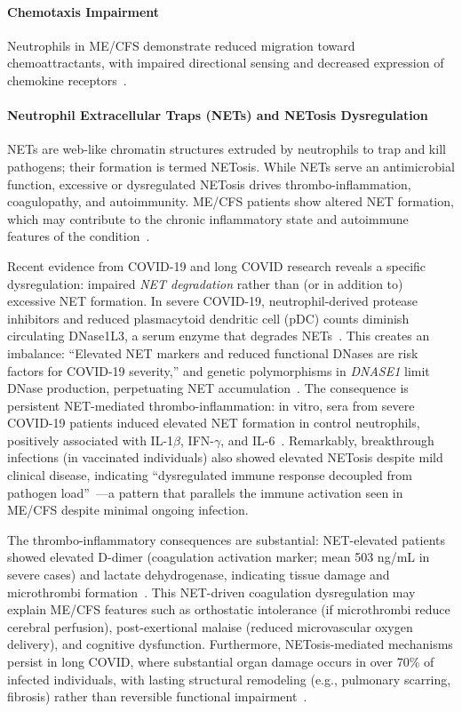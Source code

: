 \paragraph{Chemotaxis Impairment}
Neutrophils in ME/CFS demonstrate reduced migration toward chemoattractants, with impaired directional sensing and decreased expression of chemokine receptors~\cite{EatonFitch2019}.

\paragraph{Neutrophil Extracellular Traps (NETs) and NETosis Dysregulation}

NETs are web-like chromatin structures extruded by neutrophils to trap and kill pathogens; their formation is termed NETosis. While NETs serve an antimicrobial function, excessive or dysregulated NETosis drives thrombo-inflammation, coagulopathy, and autoimmunity. ME/CFS patients show altered NET formation, which may contribute to the chronic inflammatory state and autoimmune features of the condition~\cite{EatonFitch2019}.

Recent evidence from COVID-19 and long COVID research reveals a specific dysregulation: impaired \emph{NET degradation} rather than (or in addition to) excessive NET formation. In severe COVID-19, neutrophil-derived protease inhibitors and reduced plasmacytoid dendritic cell (pDC) counts diminish circulating DNase1L3, a serum enzyme that degrades NETs~\cite{GarciaLabroucheColomer2024}. This creates an imbalance: ``Elevated NET markers and reduced functional DNases are risk factors for COVID-19 severity,'' and genetic polymorphisms in \emph{DNASE1} limit DNase production, perpetuating NET accumulation~\cite{GarciaLabroucheColomer2024}. The consequence is persistent NET-mediated thrombo-inflammation: in vitro, sera from severe COVID-19 patients induced elevated NET formation in control neutrophils, positively associated with IL-1$\beta$, IFN-$\gamma$, and IL-6~\cite{Romano2022}. Remarkably, breakthrough infections (in vaccinated individuals) also showed elevated NETosis despite mild clinical disease, indicating ``dysregulated immune response decoupled from pathogen load''~\cite{Romano2022}---a pattern that parallels the immune activation seen in ME/CFS despite minimal ongoing infection.

The thrombo-inflammatory consequences are substantial: NET-elevated patients showed elevated D-dimer (coagulation activation marker; mean 503 ng/mL in severe cases) and lactate dehydrogenase, indicating tissue damage and microthrombi formation~\cite{Romano2022}. This NET-driven coagulation dysregulation may explain ME/CFS features such as orthostatic intolerance (if microthrombi reduce cerebral perfusion), post-exertional malaise (reduced microvascular oxygen delivery), and cognitive dysfunction. Furthermore, NETosis-mediated mechanisms persist in long COVID, where substantial organ damage occurs in over 70\% of infected individuals, with lasting structural remodeling (e.g., pulmonary scarring, fibrosis) rather than reversible functional impairment~\cite{Ewing2024}.


